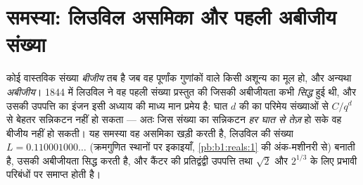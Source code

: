 \section{समस्या: लिउविल असमिका और पहली अबीजीय संख्या}

\begin{problem}
\label{pb:b1:derivative:1}
कोई वास्तविक संख्या \emph{बीजीय} तब है जब वह पूर्णांक गुणांकों वाले किसी
अशून्य  का मूल हो, और अन्यथा \emph{अबीजीय}। 1844 में लिउविल ने वह पहली
संख्या प्रस्तुत की जिसकी अबीजीयता कभी \emph{सिद्ध} हुई थी, और उसकी उपपत्ति
का इंजन इसी अध्याय की माध्य मान प्रमेय है: घात $d$ की  का परिमेय
संख्याओं से $C/q^d$ से बेहतर सन्निकटन नहीं हो सकता --- अतः जिस संख्या का
सन्निकटन \emph{हर घात से तेज़} हो सके वह बीजीय नहीं हो सकती। यह समस्या वह
असमिका खड़ी करती है, लिउविल की संख्या $L = 0.110001000\dots$ (क्रमगुणित
स्थानों पर इकाइयाँ, \cref{pb:b1:reals:1} की अंक-मशीनरी से) बनाती है, उसकी
अबीजीयता सिद्ध करती है, और कैंटर की प्रतिद्वंद्वी उपपत्ति तथा $\sqrt2$ और
$2^{1/3}$ के लिए प्रभावी परिबंधों पर समाप्त होती है।


\end{problem}
